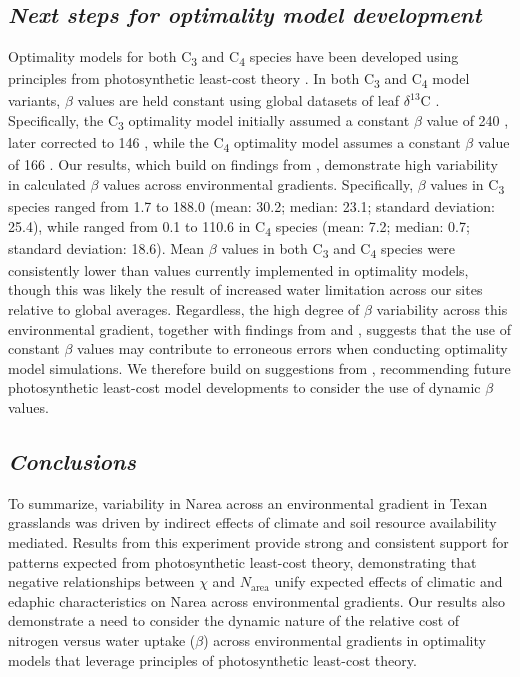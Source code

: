 \subsection{\textit{Next steps for optimality model development}}
Optimality models for both C\textsubscript{3} and C\textsubscript{4} species have been developed using principles from photosynthetic least-cost theory . In both C\textsubscript{3} and C\textsubscript{4} model variants, $\beta$ values are held constant using global datasets of leaf $\delta^{13}$C . Specifically, the C\textsubscript{3} optimality model initially assumed a constant $\beta$ value of 240 , later corrected to 146 , while the C\textsubscript{4} optimality model assumes a constant $\beta$ value of 166 . Our results, which build on findings from , demonstrate high variability in calculated $\beta$ values across environmental gradients. Specifically, $\beta$ values in C\textsubscript{3} species ranged from 1.7 to 188.0 (mean: 30.2; median: 23.1; standard deviation: 25.4), while ranged from 0.1 to 110.6 in C\textsubscript{4} species (mean: 7.2; median: 0.7; standard deviation: 18.6). Mean $\beta$ values in both C\textsubscript{3} and C\textsubscript{4} species were consistently lower than values currently implemented in optimality models, though this was likely the result of increased water limitation across our sites relative to global averages. Regardless, the high degree of $\beta$ variability across this environmental gradient, together with findings from  and , suggests that the use of constant $\beta$ values may contribute to erroneous errors when conducting optimality model simulations. We therefore build on suggestions from , recommending future photosynthetic least-cost model developments to consider the use of dynamic $\beta$ values.

\subsection{\textit{Conclusions}}
To summarize, variability in Narea across an environmental gradient in Texan grasslands was driven by indirect effects of climate and soil resource availability mediated. Results from this experiment provide strong and consistent support for patterns expected from photosynthetic least-cost theory, demonstrating that negative relationships between $\chi$ and $N_\mathrm{area}$ unify expected effects of climatic and edaphic characteristics on Narea across environmental gradients. Our results also demonstrate a need to consider the dynamic nature of the relative cost of nitrogen versus water uptake ($\beta$) across environmental gradients in optimality models that leverage principles of photosynthetic least-cost theory.